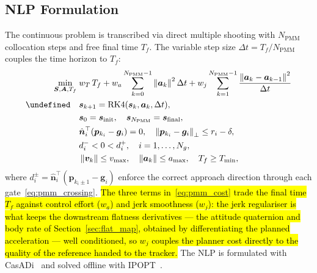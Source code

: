 \documentclass{ieeeaccess}
\let\st\undefined %
\newcommand{\hlt}[1]{\hl{#1}}
\newcommand{\norm}[1]{\left\| #1 \right\|}
\newcommand{\vect}[1]{\bm{#1}}
\newcommand{\dt}{\Delta t}
\newcommand{\st}{\text{s.t.}}
\begin{document}
\subsection{NLP Formulation}
\label{sec:pmm_nlp_formulation}

The continuous problem is transcribed via direct multiple shooting with
$N_\text{PMM}$ collocation steps and free final time $T_f$.
The variable step size $\dt = T_f/N_\text{PMM}$ couples the time horizon
to $T_f$:
%
\begin{subequations}
\label{eq:pmm_nlp}
\begin{align}
  \min_{\vect{S}, \vect{A}, T_f}\;&
     w_T\,T_f
     + w_a \sum_{k=0}^{N_\text{PMM}-1} \norm{\vect{a}_k}^2 \dt
     + w_j \sum_{k=1}^{N_\text{PMM}-1}
       \frac{\norm{\vect{a}_k - \vect{a}_{k-1}}^2}{\dt}
     \label{eq:pmm_cost}\\
  \st\quad & \vect{s}_{k+1} = \mathrm{RK4}(\vect{s}_k, \vect{a}_k, \dt),
     \label{eq:pmm_dyn_c}\\
  & \vect{s}_0 = \vect{s}_\text{init},\quad
              \vect{s}_{N_\text{PMM}} = \vect{s}_\text{final},
              \label{eq:pmm_bc}\\
  & \hat{\vect{n}}_i^\top (\vect{p}_{k_i} - \vect{g}_i) = 0,\quad
    \norm{\vect{p}_{k_i} - \vect{g}_i}_\perp \leq r_i - \delta,
              \label{eq:pmm_gate}\\
  & d_i^- < 0 < d_i^+, \quad i = 1,\dots,N_g,
              \label{eq:pmm_crossing}\\
  & \norm{\vect{v}_k} \leq v_{\max},\quad
              \norm{\vect{a}_k} \leq a_{\max},\quad T_f \geq T_{\min},
              \label{eq:pmm_bounds}
\end{align}
\end{subequations}
%
where $d_i^{\pm} = \hat{\vect{n}}_i^\top(\vect{p}_{k_i \pm 1} - \vect{g}_i)$
enforce the correct approach direction through each
gate~\eqref{eq:pmm_crossing}.
\hlt{The three terms in~\mbox{\eqref{eq:pmm_cost}} trade the final time
\mbox{$T_f$} against control effort (\mbox{$w_a$}) and jerk smoothness
(\mbox{$w_j$}): the jerk regulariser is what keeps the downstream
flatness derivatives --- the attitude quaternion and body rate of
Section~\mbox{\ref{sec:flat_map}}, obtained by differentiating the
planned acceleration --- well conditioned, so \mbox{$w_j$} couples the
planner cost directly to the quality of the reference handed to the
tracker.}
The NLP is formulated with CasADi~\cite{andersson2019casadi} and solved
offline with IPOPT~\cite{wachter2006implementation}.
\end{document}
